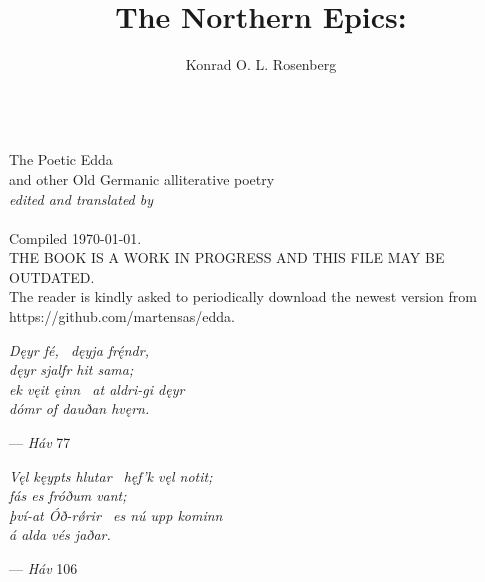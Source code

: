 \title{The Northern Epics:}
\author{Konrad O. L. Rosenberg}

\begin{titlingpage}
  \makeatletter
  \centering
  \HUGE \textsc{\@title} \\
  \Huge The Poetic Edda \\
  \huge and other Old Germanic alliterative poetry \\
  \vspace{1cm}
  \Large\emph{edited and translated by} \\
  \vspace{1cm}
  \huge \@author \\
  \vspace{4cm}
  \Large Compiled \today. \\
  \vspace{1cm}
  THE BOOK IS A WORK IN PROGRESS AND THIS FILE MAY BE OUTDATED. \\
  The reader is kindly asked to periodically download the newest version from https://github.com/martensas/edda.
  \makeatother
\end{titlingpage}

\newpage\thispagestyle{empty}

\vspace*{\fill}

\begin{center}{\Large \emph{Dęyr fé, \hld\ dęyja frę́ndr, \\
dęyr sjalfr hit sama; \\
ek vęit ęinn \hld\ at aldri-gi dęyr \\
dómr of dauðan hvęrn.}}\end{center}

\begin{flushright}%
— \emph{Háv} 77%
\end{flushright}

\vspace{5mm}

\begin{center}{\Large \emph{Vęl kęypts hlutar \hld\ hęf’k vęl notit; \\
fás es fróðum vant; \\
því-at Óð-rǿrir \hld\ es nú upp kominn \\
á alda vés jaðar.}}\end{center}

\begin{flushright}%
— \emph{Háv} 106%
\end{flushright}

